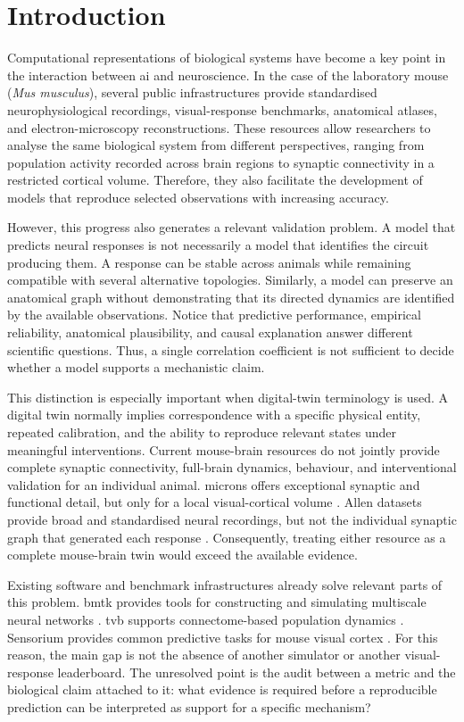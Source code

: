\section{Introduction}
\label{sec:introduction}

Computational representations of biological systems have become a key point in
the interaction between \ac{ai} and neuroscience. In the case of the laboratory
mouse (\textit{Mus musculus}), several public infrastructures provide standardised
neurophysiological recordings, visual-response benchmarks, anatomical atlases,
and electron-microscopy reconstructions. These resources allow researchers to
analyse the same biological system from different perspectives, ranging from
population activity recorded across brain regions to synaptic connectivity in a
restricted cortical volume. Therefore, they also facilitate the development of
models that reproduce selected observations with increasing accuracy.

However, this progress also generates a relevant validation problem. A model
that predicts neural responses is not necessarily a model that identifies the
circuit producing them. A response can be stable across animals while remaining
compatible with several alternative topologies. Similarly, a model can preserve
an anatomical graph without demonstrating that its directed dynamics are
identified by the available observations. Notice that predictive performance,
empirical reliability, anatomical plausibility, and causal explanation answer
different scientific questions. Thus, a single correlation coefficient is not
sufficient to decide whether a model supports a mechanistic claim.

This distinction is especially important when digital-twin terminology is used.
A digital twin normally implies correspondence with a specific physical entity,
repeated calibration, and the ability to reproduce relevant states under
meaningful interventions. Current mouse-brain resources do not jointly provide
complete synaptic connectivity, full-brain dynamics, behaviour, and
interventional validation for an individual animal. \ac{microns} offers
exceptional synaptic and functional detail, but only for a local visual-cortical
volume \citep{bae2025microns}. Allen datasets provide broad and standardised
neural recordings, but not the individual synaptic graph that generated each
response \citep{siegle2021survey}. Consequently,
treating either resource as a complete mouse-brain twin would exceed the
available evidence.

Existing software and benchmark infrastructures already solve relevant parts of
this problem. \ac{bmtk} provides tools for constructing and simulating multiscale
neural networks \citep{dai2020bmtk}. \ac{tvb} supports connectome-based
population dynamics \citep{tvb2013}. Sensorium provides common predictive tasks
for mouse visual cortex \citep{willeke2022sensorium,turishcheva2023dynamic}.
For this reason, the main gap is not the absence of another simulator or another
visual-response leaderboard. The unresolved point is the audit between a metric
and the biological claim attached to it: what evidence is required before a
reproducible prediction can be interpreted as support for a specific mechanism?

